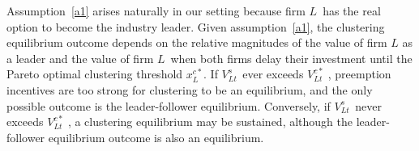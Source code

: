\documentclass[nogrid,nosurname,sort&compress]{RFS}
\begin{document}
Assumption~\ref{a1} arises naturally in our setting because firm $L$\ has the real option to
become the industry leader. Given assumption~\ref{a1}, the clustering equilibrium outcome depends
on the relative magnitudes of the value of firm $L$ as a leader and the value of firm $L$\ when
both firms delay their investment until the Pareto optimal clustering threshold $x_{L}^{c\ast }$.
If $V_{Lt\text{ }}^{s}$ever exceeds $V_{Lt\text{ }}^{c\ast }$, preemption incentives are too
strong for clustering to be an equilibrium, and the only possible outcome is the leader-follower
equilibrium. Conversely, if $V_{Lt\text{ }}^{s}$never exceeds $V_{Lt\text{ }}^{c\ast }$, a
clustering equilibrium may be sustained, although the leader-follower equilibrium outcome is also
an equilibrium.

\end{document}
